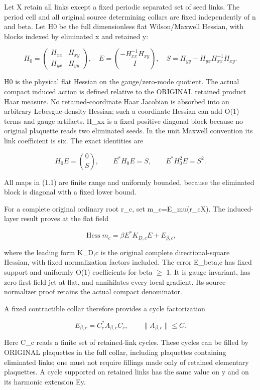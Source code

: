 \documentclass[
  11pt,
]{article}
\begin{document}
Let X retain all links except a fixed periodic separated set of seed
links. The period cell and all original source determining collars are
fixed independently of n and beta. Let H0 be the full dimensionless flat
Wilson/Maxwell Hessian, with blocks indexed by eliminated x and retained
y:

\[
 H_0=\begin{pmatrix}H_{xx}&H_{xy}\\H_{yx}&H_{yy}\end{pmatrix},
 \quad
 E=\binom{-H_{xx}^{-1}H_{xy}}{I},
 \quad
 S=H_{yy}-H_{yx}H_{xx}^{-1}H_{xy}.
\tag{1.1}
\]

H0 is the physical flat Hessian on the gauge/zero-mode quotient. The
actual compact induced action is defined relative to the ORIGINAL
retained product Haar measure. No retained-coordinate Haar Jacobian is
absorbed into an arbitrary Lebesgue-density Hessian; such a coordinate
Hessian can add O(1) terms and gauge artifacts. H\_xx is a fixed
positive diagonal block because no original plaquette reads two
eliminated seeds. In the unit Maxwell convention its link coefficient is
six. The exact identities are

\[
 H_0E=\binom0S,
 \qquad E^*H_0E=S,
 \qquad E^*H_0^2E=S^2.
\tag{1.2}
\]

All maps in (1.1) are finite range and uniformly bounded, because the
eliminated block is diagonal with a fixed lower bound.

For a complete original ordinary root r\_c, set
m\_c=E\_mu(r\_c\textbar X). The induced-layer result proves at the flat
field

\[
 \operatorname{Hess}m_c
 =\beta E^*K_{D,c}E+E_{\beta,c},
\tag{1.3}
\]

where the leading form K\_D,c is the original complete
directional-square Hessian, with fixed normalization factors included.
The error E\_beta,c has fixed support and uniformly O(1) coefficients
for beta \(\geq\) 1. It is gauge invariant, has zero first field jet at
flat, and annihilates every local gradient. Its source-normalizer proof
retains the actual compact denominator.

A fixed contractible collar therefore provides a cycle factorization

\[
 E_{\beta,c}=C_c^*A_{\beta,c}C_c,
 \qquad \|A_{\beta,c}\|\le C.
\tag{1.4}
\]

Here C\_c reads a finite set of retained-link cycles. These cycles can
be filled by ORIGINAL plaquettes in the full collar, including
plaquettes containing eliminated links; one must not require fillings
made only of retained elementary plaquettes. A cycle supported on
retained links has the same value on y and on its harmonic extension Ey.
\end{document}
